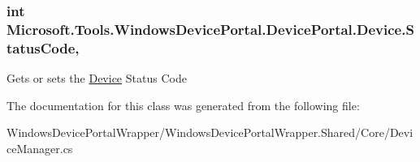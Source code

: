 \subsubsection[{\texorpdfstring{Status\+Code}{StatusCode}}]{\setlength{\rightskip}{0pt plus 5cm}int Microsoft.\+Tools.\+Windows\+Device\+Portal.\+Device\+Portal.\+Device.\+Status\+Code\hspace{0.3cm}{\ttfamily [get]}, {\ttfamily [set]}}\hypertarget{class_microsoft_1_1_tools_1_1_windows_device_portal_1_1_device_portal_1_1_device_a2cb8da8bf2c4631922d76fab5b6ad29e}{}\label{class_microsoft_1_1_tools_1_1_windows_device_portal_1_1_device_portal_1_1_device_a2cb8da8bf2c4631922d76fab5b6ad29e}


Gets or sets the \hyperlink{class_microsoft_1_1_tools_1_1_windows_device_portal_1_1_device_portal_1_1_device}{Device} Status Code 



The documentation for this class was generated from the following file\+:\begin{DoxyCompactItemize}
\item 
Windows\+Device\+Portal\+Wrapper/\+Windows\+Device\+Portal\+Wrapper.\+Shared/\+Core/Device\+Manager.\+cs\end{DoxyCompactItemize}
